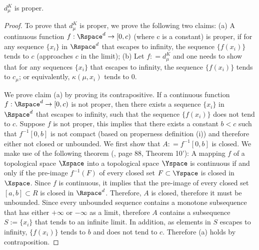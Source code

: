 \documentclass[11pt]{myclass}
\begin{document}
\begin{lemma} 
$d^K_{\mu}$ is proper. 
\label{lem:proper-app}
\end{lemma}
\begin{proof}
To prove that $d^K_{\mu}$ is proper, we prove the following two claims: 
(a) A continuous function $f: \Rspace^d \to [0, c)$ (where c is a constant) is proper, if for any sequence $\{x_i\}$ in $\Rspace^d$ that escapes to infinity, the sequence 
$\{f(x_i)\}$ tends to $c$ (approaches $c$ in the limit);
(b) Let $f: = d^K_{\mu}$ and one needs to show that for any sequences $\{x_i\}$ that escapes to infinity, the sequence $\{f(x_i)\}$ tends to $c_{\mu}$; or equivalently, 
$\kappa(\mu, x_i)$ tends to $0$.

We prove claim (a) by proving its contrapositive.   
If a continuous function $f: \Rspace^d \to [0, c)$ is not proper, then there exists a sequence $\{x_i\}$ in $\Rspace^d$ that escapes to infinity, such that the sequence $\{f(x_i)\}$ does not tend to $c$. 
Suppose $f$ is not proper, this implies that there exists a constant $b < c$ such that $f^{-1}[0,b]$ is not compact (based on properness definition (i)) and therefore either not closed or unbounded. 
We first show that $A: = f^{-1}[0,b]$ is closed. 
We make use of the following theorem (\cite{KolmogorovFominSilverman1975}, page 88, Theorem 10'):
A mapping $f$ of a topological space $\Xspace$ into a topological space $\Yspace$ is continuous if and only if the pre-image $f^{-1}(F)$ of every closed set $F \subset \Yspace$ is closed in $\Xspace$.  
Since $f$ is continuous, it implies that the pre-image of every closed set $[a,b] \subset  R$ is closed in $\Rspace^d$. Therefore, $A$ is closed, therefore it must be unbounded.
Since every unbounded sequence contains a monotone subsequence
that has either $+\infty$ or $-\infty$ as a limit, 
therefore $A$ contains a subsequence $S := \{x_i\}$ that tends to an infinite limit. 
In addition, as elements in $S$ escapes to infinity, $\{f(x_i)\}$ tends to $b$ and does not tend to $c$.
Therefore (a) holds by contraposition. 


\end{proof}
\end{document}
